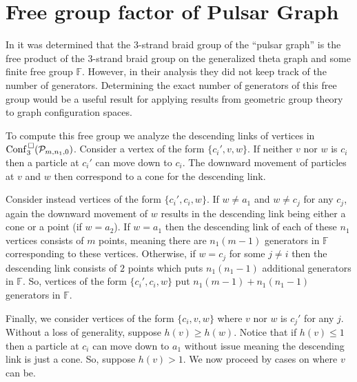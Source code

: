 \section{Free group factor of Pulsar Graph}

In \cite{appiah2024algebraicstructurehyperbolicgraph} it was determined that the 3-strand braid group of the ``pulsar graph''
is the free product of the 3-strand braid group on the generalized theta graph and some finite free group \(\mathbb{F}\).
However, in their analysis they did not keep track of the number of generators.
Determining the exact number of generators of this free group would be a useful result for applying
results from geometric group theory to graph configuration spaces.

To compute this free group we analyze the descending links of vertices in \(\mathrm{Conf}^{\,\square}_3(\mathcal{P}_{m,n_1,0})\).
Consider a vertex of the form \(\{c_i', v, w\}\).
If neither \(v\) nor \(w\) is \(c_i\)
then a particle at \(c_i'\) can move down to \(c_i\).
The downward movement of particles at \(v\) and \(w\) then correspond to a cone for the descending link.

Consider instead vertices of the form \(\{c_i', c_i, w\}\).
If \(w \neq a_1\) and \(w \neq c_j\) for any \(c_j\),
again the downward movement of \(w\) results in the descending link being either a cone or a point (if \(w = a_2\)).
If \(w = a_1\) then the descending link of each of these \(n_1\) vertices consists of \(m\) points,
meaning there are \(n_1 (m - 1)\) generators in \(\mathbb{F}\) corresponding to these vertices.
Otherwise, if \(w = c_j\) for some \(j \neq i\) then the descending link consists of \(2\) points which puts \(n_1 (n_1 - 1)\) additional generators in \(\mathbb{F}\).
So, vertices of the form \(\{c_i', c_i, w\}\) put \(n_1 (m-1) + n_1 (n_1 - 1)\) generators in \(\mathbb{F}\).

Finally, we consider vertices of the form \(\{c_i, v, w\}\) where \(v\) nor \(w\) is \(c_j'\) for any \(j\).
Without a loss of generality, suppose \(h(v) \ge h(w)\).
Notice that if \(h(v) \le 1\) then a particle at \(c_i\) can move down to \(a_1\) without issue meaning the descending link is just a cone.
So, suppose \(h(v) > 1\).
We now proceed by cases on where \(v\) can be.

